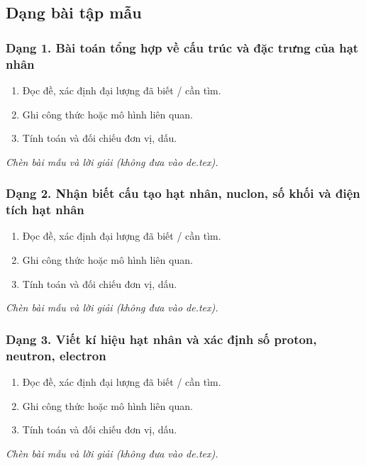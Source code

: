 

\subsection{Dạng bài tập mẫu}
\subsubsection{Dạng 1. Bài toán tổng hợp về cấu trúc và đặc trưng của hạt nhân}
\begin{phuongphap}
\begin{enumerate}
\item Đọc đề, xác định đại lượng đã biết / cần tìm.
\item Ghi công thức hoặc mô hình liên quan.
\item Tính toán và đối chiếu đơn vị, dấu.
\end{enumerate}
\end{phuongphap}
\begin{vidumau}
\textit{Chèn bài mẫu và lời giải (không đưa vào de.tex).}
\end{vidumau}

\subsubsection{Dạng 2. Nhận biết cấu tạo hạt nhân, nuclon, số khối và điện tích hạt nhân}
\begin{phuongphap}
\begin{enumerate}
\item Đọc đề, xác định đại lượng đã biết / cần tìm.
\item Ghi công thức hoặc mô hình liên quan.
\item Tính toán và đối chiếu đơn vị, dấu.
\end{enumerate}
\end{phuongphap}
\begin{vidumau}
\textit{Chèn bài mẫu và lời giải (không đưa vào de.tex).}
\end{vidumau}

\subsubsection{Dạng 3. Viết kí hiệu hạt nhân và xác định số proton, neutron, electron}
\begin{phuongphap}
\begin{enumerate}
\item Đọc đề, xác định đại lượng đã biết / cần tìm.
\item Ghi công thức hoặc mô hình liên quan.
\item Tính toán và đối chiếu đơn vị, dấu.
\end{enumerate}
\end{phuongphap}
\begin{vidumau}
\textit{Chèn bài mẫu và lời giải (không đưa vào de.tex).}
\end{vidumau}

